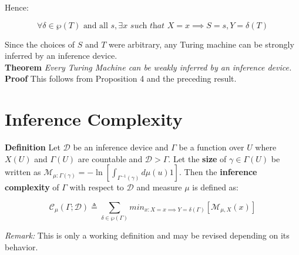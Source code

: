 \documentclass[11pt]{article}
\newcommand{\B}{\mathbb{B}}
\begin{document}
Hence:

$$ \forall \delta \in \wp(T)\text{ and all } s,  \exists x \textit{ such that } X = x \implies S = s, Y = \delta(T) $$ 

Since the choices of $S$ and $T$ were arbitrary, any Turing machine can be strongly inferred by an inference device. \\


\textbf{Theorem} \quad \textit{Every Turing Machine can be weakly inferred by an inference device.}\\
\textbf{Proof} \quad This follows from Proposition 4 and the preceding result.










% 

\section{Inference Complexity}

\textbf{Definition} \quad Let $ \mathcal{D} $ be an inference device and $ \Gamma $ be a function over $ U $ where $ X(U) $ and $ \Gamma(U) $ are countable and $ \mathcal{D} > \Gamma $. Let the \textbf{size} of $\gamma \in \Gamma(U) $ be written as $ \mathcal{M}_{\mu:\Gamma(\gamma)} = -\ln[\int_{\Gamma^{-1}(\gamma)} d\mu(u) 1] $. Then the \textbf{inference complexity} of $ \Gamma $ with respect to $ \mathcal{D} $ and measure $ \mu $ is defined as: 

$$ \mathcal{C}_{\mu}(\Gamma ; \mathcal{D}) \triangleq \sum_{\delta \in \wp(\Gamma)} min_{x : X = x \implies Y = \delta(\Gamma) } [\mathcal{M}_{\mu, X} (x)]	$$ 

\textit{Remark:} This is only a working definition and may be revised depending on its behavior.

\end{document}
